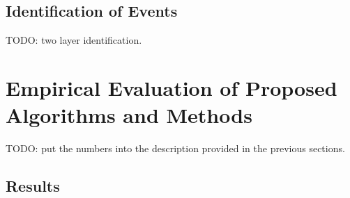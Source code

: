 \documentclass{IEEEtran}
\begin{document}
\subsection{Identification of Events}

TODO: two layer identification. 

\section{Empirical Evaluation of Proposed Algorithms and Methods}
\label{Evaluation}

% 
%

TODO: put the numbers into the description provided in the previous sections. 

\subsection{Results}
\end{document}
